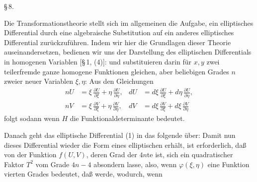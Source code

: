 \begin{center}
\S\,8. \textbf{}
\end{center}

Die  Transformationstheorie stellt sich im allgemeinen die
Aufgabe, ein elliptisches Differential durch eine algebraische
Substitution auf ein anderes elliptisches Differential zurückzuführen.
Indem wir hier die Grundlagen dieser Theorie auseinandersetzen, bedienen
wir uns der Darstellung des elliptischen Differentials in homogenen
Variablen [\S\,1, (4)]:
und substituieren darin für $x,y$ zwei teilerfremde ganze homogene
Funktionen gleichen, aber beliebigen Grades $n$ zweier neuer Variablen
$\xi,\eta$:
Aus den Gleichungen
\[
\begin{aligned}
nU &= \xi\,\frac{\partial U}{\partial \xi} + \eta\,\frac{\partial U}{\partial \eta}, &
dU &= d\xi\,\frac{\partial U}{\partial \xi} + d\eta\,\frac{\partial U}{\partial \eta},\\
nV &= \xi\,\frac{\partial V}{\partial \xi} + \eta\,\frac{\partial V}{\partial \eta}, &
dV &= d\xi\,\frac{\partial V}{\partial \xi} + d\xi\,\frac{\partial V}{\partial \eta} %
\end{aligned}
\]
folgt sodann
wenn $H$ die Funktionaldeterminante
bedeutet.

Danach geht das elliptische Differential (1) in das folgende über:
Damit nun dieses Differential wieder die Form eines elliptischen erhält,
ist erforderlich, daß von der Funktion $f(U,V)$, deren Grad der $4n$te
ist, sich ein quadratischer Faktor $T^2$ vom Grade $4n-4$ absondern
lasse, also, wenn $\varphi(\xi,\eta)$ eine Funktion vierten Grades
bedeutet, daß
werde, wodurch, wenn
